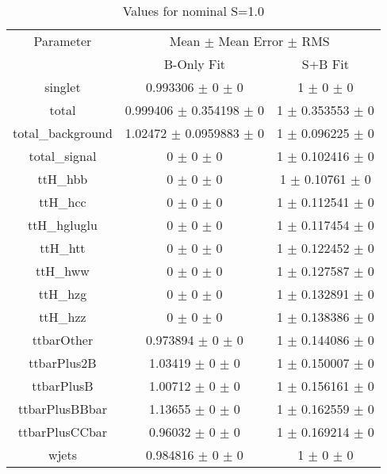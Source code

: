 \begin{table}
\centering
\caption{Values for nominal S=1.0}
\begin{tabular}{ccc}
\toprule
Parameter & \multicolumn{2}{c}{Mean $\pm$ Mean Error $\pm$ RMS}\\
 & B-Only Fit & S+B Fit\\
\midrule
singlet & \num{0.993306} $\pm$ \num{0} $\pm$ \num{0} & \num{1} $\pm$ \num{0} $\pm$ \num{0}\\
total & \num{0.999406} $\pm$ \num{0.354198} $\pm$ \num{0} & \num{1} $\pm$ \num{0.353553} $\pm$ \num{0}\\
total\_background & \num{1.02472} $\pm$ \num{0.0959883} $\pm$ \num{0} & \num{1} $\pm$ \num{0.096225} $\pm$ \num{0}\\
total\_signal & \num{0} $\pm$ \num{0} $\pm$ \num{0} & \num{1} $\pm$ \num{0.102416} $\pm$ \num{0}\\
ttH\_hbb & \num{0} $\pm$ \num{0} $\pm$ \num{0} & \num{1} $\pm$ \num{0.10761} $\pm$ \num{0}\\
ttH\_hcc & \num{0} $\pm$ \num{0} $\pm$ \num{0} & \num{1} $\pm$ \num{0.112541} $\pm$ \num{0}\\
ttH\_hgluglu & \num{0} $\pm$ \num{0} $\pm$ \num{0} & \num{1} $\pm$ \num{0.117454} $\pm$ \num{0}\\
ttH\_htt & \num{0} $\pm$ \num{0} $\pm$ \num{0} & \num{1} $\pm$ \num{0.122452} $\pm$ \num{0}\\
ttH\_hww & \num{0} $\pm$ \num{0} $\pm$ \num{0} & \num{1} $\pm$ \num{0.127587} $\pm$ \num{0}\\
ttH\_hzg & \num{0} $\pm$ \num{0} $\pm$ \num{0} & \num{1} $\pm$ \num{0.132891} $\pm$ \num{0}\\
ttH\_hzz & \num{0} $\pm$ \num{0} $\pm$ \num{0} & \num{1} $\pm$ \num{0.138386} $\pm$ \num{0}\\
ttbarOther & \num{0.973894} $\pm$ \num{0} $\pm$ \num{0} & \num{1} $\pm$ \num{0.144086} $\pm$ \num{0}\\
ttbarPlus2B & \num{1.03419} $\pm$ \num{0} $\pm$ \num{0} & \num{1} $\pm$ \num{0.150007} $\pm$ \num{0}\\
ttbarPlusB & \num{1.00712} $\pm$ \num{0} $\pm$ \num{0} & \num{1} $\pm$ \num{0.156161} $\pm$ \num{0}\\
ttbarPlusBBbar & \num{1.13655} $\pm$ \num{0} $\pm$ \num{0} & \num{1} $\pm$ \num{0.162559} $\pm$ \num{0}\\
ttbarPlusCCbar & \num{0.96032} $\pm$ \num{0} $\pm$ \num{0} & \num{1} $\pm$ \num{0.169214} $\pm$ \num{0}\\
wjets & \num{0.984816} $\pm$ \num{0} $\pm$ \num{0} & \num{1} $\pm$ \num{0} $\pm$ \num{0}\\
\bottomrule
\end{tabular}
\end{table}